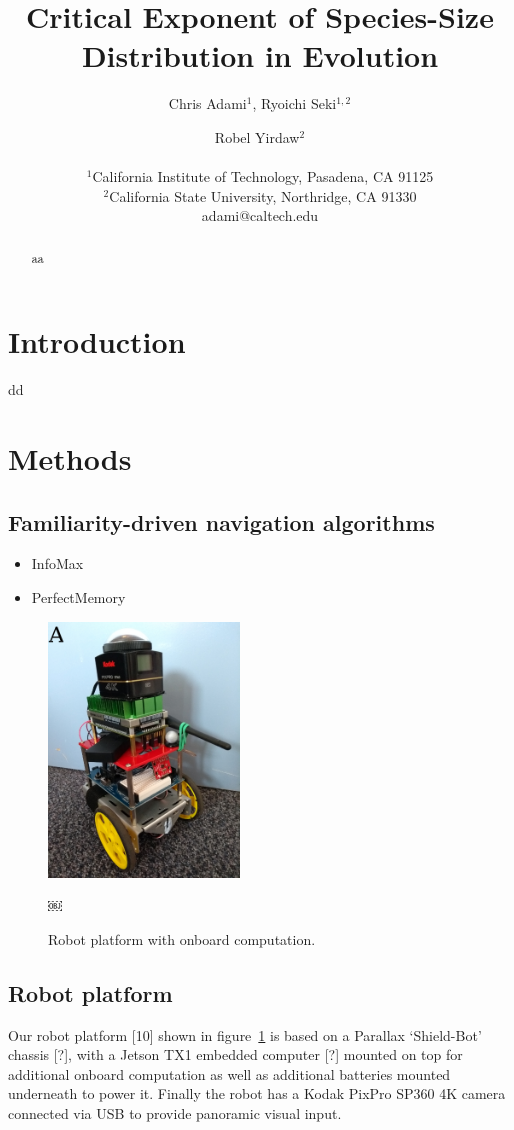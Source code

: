 \documentclass[letterpaper]{article}
\title{Critical Exponent of Species-Size Distribution in Evolution}
\author{Chris Adami$^{1}$, Ryoichi Seki$^{1,2}$ \and Robel Yirdaw$^2$ \\
\mbox{}\\
$^1$California Institute of Technology, Pasadena, CA 91125 \\
$^2$California State University, Northridge, CA 91330 \\
adami@caltech.edu} %
\begin{document}
\maketitle

\begin{abstract}
  aa
\end{abstract}

\section{Introduction}
dd

\section{Methods}
\subsection{Familiarity-driven navigation algorithms}
\begin{itemize}
    \item InfoMax
    \item PerfectMemory
\end{itemize}

\begin{figure}[t]
    \centering
    \includegraphics[width=2in]{figures/robot.jpg}
    \caption{Robot platform with onboard computation.}￼
    \label{fig:robot}
\end{figure}

\subsection{Robot platform}
\label{sec:robot_platform}
Our robot platform [10] shown in figure~\ref{fig:robot} is based on a Parallax ‘Shield-Bot’ chassis [?], with a Jetson TX1 embedded computer [?] mounted on top for additional onboard computation as well as additional batteries mounted underneath to power it. 
Finally the robot has a Kodak PixPro SP360 4K camera connected via USB to provide panoramic visual input.
\end{document}
